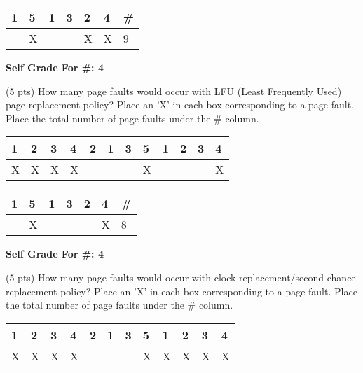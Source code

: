\documentclass[conference]{IEEEtran}
\begin{document}
\begin{itemize}
\begin{table}[H]
	\centering
	\begin{tabular}{|l|l|l|l|l|l|l|}
		\hline
		\textbf{1} & \textbf{5} & \textbf{1} & \textbf{3} & \textbf{2} & \textbf{4} & \textbf{\#} \\ \hline
		& X &  &  & X & X & 9 \\ \hline
	\end{tabular}
\end{table}

\begin{center}
	\textbf{Self Grade For \#: 4}
\end{center}

(5 pts) How many page faults would occur with LFU (Least Frequently Used) page
replacement policy? Place an 'X' in each box corresponding to a page fault. Place the total number
of page faults under the \# column.
\begin{table}[H]
	\centering
	\begin{tabular}{|l|l|l|l|l|l|l|l|l|l|l|l|}
		\hline
		\textbf{1} & \textbf{2} & \textbf{3} & \textbf{4} & \textbf{2} & \textbf{1} & \textbf{3} & \textbf{5} & \textbf{1} & \textbf{2} & \textbf{3} & \textbf{4} \\ \hline
		X & X & X & X &  &  &  & X &  &  &  & X \\ \hline
	\end{tabular}
\end{table}

\begin{table}[H]
	\centering
	\begin{tabular}{|l|l|l|l|l|l|l|}
		\hline
		\textbf{1} & \textbf{5} & \textbf{1} & \textbf{3} & \textbf{2} & \textbf{4} & \textbf{\#} \\ \hline
		& X &  &  &  & X & 8 \\ \hline
	\end{tabular}
\end{table}

\begin{center}
	\textbf{Self Grade For \#: 4}
\end{center}

(5 pts) How many page faults would occur with clock replacement/second chance
replacement policy? Place an 'X' in each box corresponding to a page fault. Place the total number
of page faults under the \# column.
\begin{table}[H]
	\centering
	\begin{tabular}{|l|l|l|l|l|l|l|l|l|l|l|l|}
		\hline
		\textbf{1} & \textbf{2} & \textbf{3} & \textbf{4} & \textbf{2} & \textbf{1} & \textbf{3} & \textbf{5} & \textbf{1} & \textbf{2} & \textbf{3} & \textbf{4} \\ \hline
		X & X & X & X &  &  &  & X & X & X & X & X \\ \hline
	\end{tabular}
\end{table}


\end{itemize}
\end{document}
